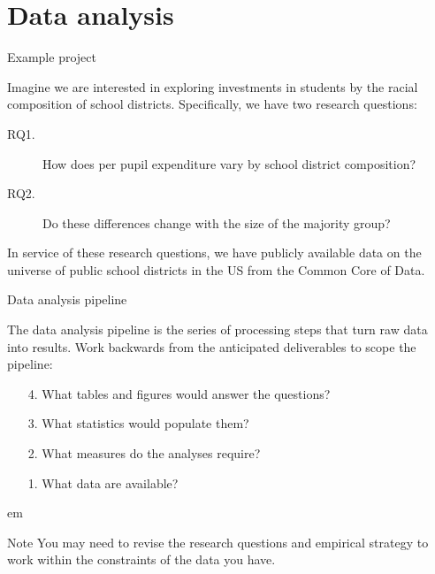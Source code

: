 \documentclass{beamer}
\begin{document}
\section{Data analysis}

\begin{frame}{Example project}

  Imagine we are interested in exploring investments in students by the racial composition of school districts. Specifically, we have two research questions:

  \begin{description}
    \item[RQ1.] How does per pupil expenditure vary by school district composition?
    \item[RQ2.] Do these differences change with the size of the majority group?
  \end{description}

  In service of these research questions, we have publicly available data on the universe of public school districts in the US from the Common Core of Data.

\end{frame}

\begin{frame}{Data analysis pipeline}

  The data analysis pipeline is the series of processing steps that turn raw data into results. Work backwards from the anticipated deliverables to scope the pipeline:

  \begin{enumerate}
    \item[4.] What tables and figures would answer the questions?
    \item[3.] What statistics would populate them?
    \item[2.] What measures do the analyses require?
    \item[1.] What data are available?
  \end{enumerate}

   em
  \begin{block}{Note}
    You may need to revise the research questions and empirical strategy to work within the constraints of the data you have.
  \end{block}

\end{frame}
\end{document}
